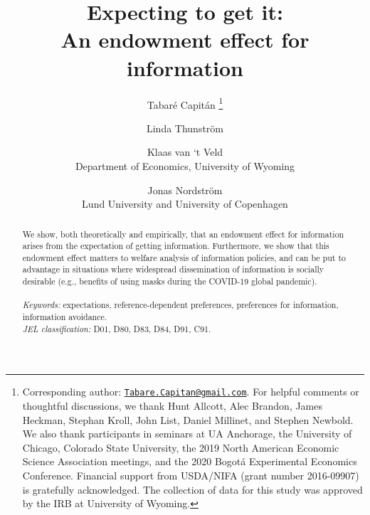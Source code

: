
\title{\vspace{-3cm}
      Expecting to get it: \\ An endowment effect for information
      }


\author{Tabaré Capitán
          \thanks{Corresponding author: \href{mailto:Tabare.Capitan@gmail.com}{\texttt{Tabare.Capitan@gmail.com}}. For helpful comments or thoughtful discussions, we thank Hunt Allcott, Alec Brandon, James Heckman, Stephan Kroll, John List, Daniel Millinet, and Stephen Newbold. We also thank participants in seminars at UA Anchorage, the University of Chicago, Colorado State University, the 2019 North American Economic Science Association meetings, and the 2020 Bogotá Experimental Economics Conference. Financial support from USDA/NIFA (grant number 2016-09907) is gratefully acknowledged. The collection of data for this study was approved by the IRB at University of Wyoming.}
        \and
        Linda Thunström
        \and
        Klaas van ‘t Veld
          \\ \small{Department of Economics, University of Wyoming}
        \and
        Jonas Nordström
          \\ \small{Lund University and University of Copenhagen}
        }

\maketitle

\thispagestyle{empty}   %

\begin{abstract}

\noindent
We show, both theoretically and empirically, that an endowment effect for information arises from the expectation of getting information. Furthermore, we show that this endowment effect matters to welfare analysis of information policies, and can be put to advantage in situations where widespread dissemination of information is socially desirable (e.g., benefits of using masks during the COVID-19 global pandemic).
\\
\\
\textit{Keywords:} expectations, reference-dependent preferences, preferences for information, information avoidance.
\\
\textit{JEL classification:} D01, D80, D83, D84, D91, C91.

\end{abstract}

\clearpage

